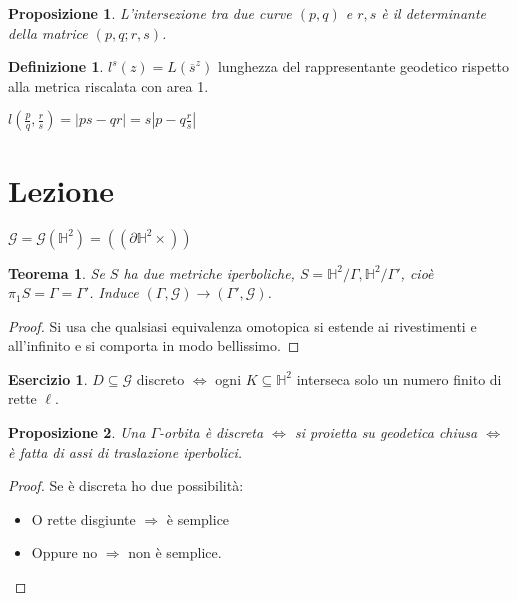 \documentclass[a4paper]{article}
\newtheorem{theorem}{Teorema}
\newtheorem{proposition}{Proposizione}
\theoremstyle{definition}
\newtheorem{definition}{Definizione}
\newtheorem{exercise}{Esercizio}
\begin{document}
    \begin{proposition}
        L'intersezione tra due curve $(p,q)$ e $r,s$ è il determinante della matrice $(p,q;r,s)$.
    \end{proposition}

    \begin{definition}
        $l^s(z) = L(\overline{s}^z)$ lunghezza del rappresentante geodetico rispetto alla metrica riscalata con area 1. 
    \end{definition}
    $ l(\frac{p}{q}, \frac{r}{s}) = |ps-qr| = s|p-q \frac{r}{s}|$


\section{Lezione}
    
    $\mathcal G = \mathcal G(\mathbb H^2 ) = \left(\left(\partial \mathbb H^2 \times\right)\right)$ 

    \begin{theorem}
        Se $S$ ha due metriche iperboliche, $S = \mathbb H^2 /\Gamma, \mathbb H^2 /\Gamma'$, cioè $\pi_{1} S = \Gamma = \Gamma'$.
        Induce $(\Gamma, \mathcal G) \xrightarrow{~} (\Gamma', \mathcal G)$.
    \end{theorem}

    \begin{proof}
        Si usa che qualsiasi equivalenza omotopica si estende ai rivestimenti e all'infinito e si comporta in modo bellissimo.
    \end{proof}

    \begin{exercise}
         $D \subseteq \mathcal G$ discreto $\Leftrightarrow$ ogni $K \subseteq \mathbb H^2$ interseca solo un numero finito di rette $\ell$.
    \end{exercise}

    \begin{proposition}
        Una $\Gamma$-orbita è discreta $\Leftrightarrow$ si proietta su geodetica chiusa $\Leftrightarrow$ è fatta di assi di traslazione iperbolici.
    \end{proposition}

    \begin{proof}
        Se è discreta ho due possibilità:
        \begin{itemize}
            \item O rette disgiunte $\Rightarrow$ è semplice
            \item Oppure no $\Rightarrow$ non è semplice.
        \end{itemize}
    \end{proof}
\end{document}
